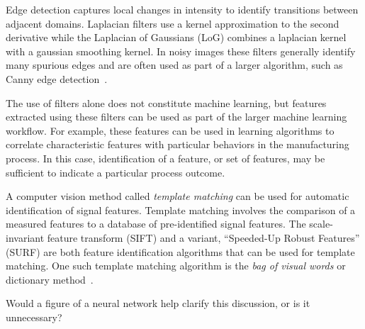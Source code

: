 Edge detection captures local changes in intensity to identify transitions between adjacent domains. Laplacian filters use a kernel approximation to the second derivative while the Laplacian of Gaussians (LoG) combines a laplacian kernel with a gaussian smoothing kernel. In noisy images these filters generally identify many spurious edges and are often used as part of a larger algorithm, such as Canny edge detection~\cite{Canny1986}.

The use of filters alone does not constitute machine learning, but features extracted using these filters can be used as part of the larger machine learning workflow. For example, these features can be used in learning algorithms to correlate characteristic features with particular behaviors in the manufacturing process. In this case, identification of a feature, or set of features, may be sufficient to indicate a particular process outcome.

A computer vision method called  \textit{template matching} can be used for automatic identification of signal features. Template matching involves the comparison of a measured features to a database of pre-identified signal features. The scale-invariant feature transform (SIFT) \cite{Lowe2004} and a variant, ``Speeded-Up Robust Features'' (SURF) \cite{Bay2008} are both feature identification algorithms that can be used for template matching. One such template matching algorithm is the \textit{bag of visual words} or dictionary method~\cite{DeCost2015}.%

{\color{red} Would a figure of a neural network help clarify this discussion, or is it unnecessary?}

